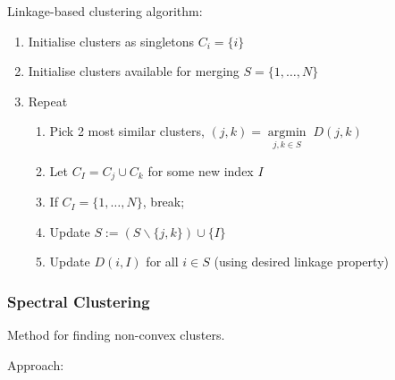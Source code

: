 \documentclass[11pt, %
	oneside, %
	english, %
	onehalfspacing, %
	parskip, %
	]{article} %
\theoremstyle{definition}
\begin{document}
Linkage-based clustering algorithm:
\begin{enumerate}
	\item Initialise clusters as singletons $C_i=\{i\}$
	\item Initialise clusters available for merging $S=\{1, \ldots, N\}$
	\item Repeat
	\begin{enumerate}
		\item Pick 2 most similar clusters, $(j, k)=\underset{j, k \in S}{\operatorname{arg min }} \; D(j, k)$
		\item Let $C_I=C_j \cup C_k$ for some new index $I$
		\item If $C_I=\{1, \ldots, N\}$, break;
		\item Update $S:=(S \backslash\{j, k\}) \cup\{I\}$
		\item Update $D(i, I)$ for all $i \in S$ (using desired linkage property)
	\end{enumerate}
\end{enumerate}

\subsubsection*{Spectral Clustering}

Method for finding non-convex clusters.

Approach:
\end{document}
